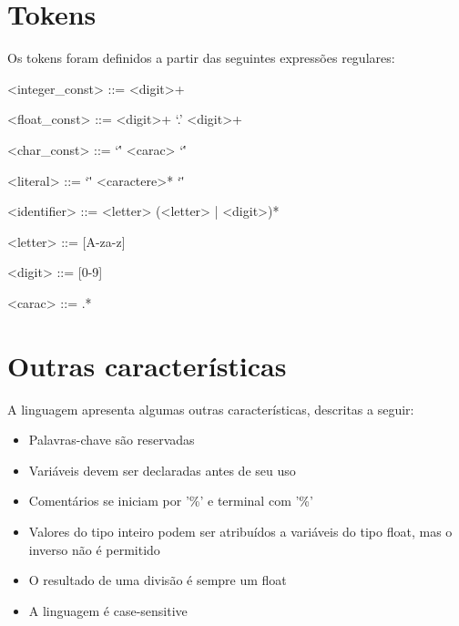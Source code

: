 \section{Tokens}
\label{sec:tokens}

Os tokens foram definidos a partir das seguintes expressões regulares:

\begin{grammar}

<integer_const> ::= <digit>+

<float_const> ::= <digit>+ `.' <digit>+

<char_const> ::= `\'' <carac> `\''

<literal> ::= `\"' <caractere>* `\"'

<identifier> ::= <letter> (<letter> | <digit>)*

<letter> ::= [A-za-z]

<digit> ::= [0-9]

<carac> ::= .*

\end{grammar}

\section{Outras características}
\label{sec:caracteristicas}

A linguagem apresenta algumas outras características, descritas a seguir:

\begin{itemize}
\item Palavras-chave são reservadas
\item Variáveis devem ser declaradas antes de seu uso
\item Comentários se iniciam por '\%' e terminal com '\%'
\item Valores do tipo inteiro podem ser atribuídos a variáveis do tipo float, mas o inverso não é permitido
\item O resultado de uma divisão é sempre um float
\item A linguagem é case-sensitive
\end{itemize}